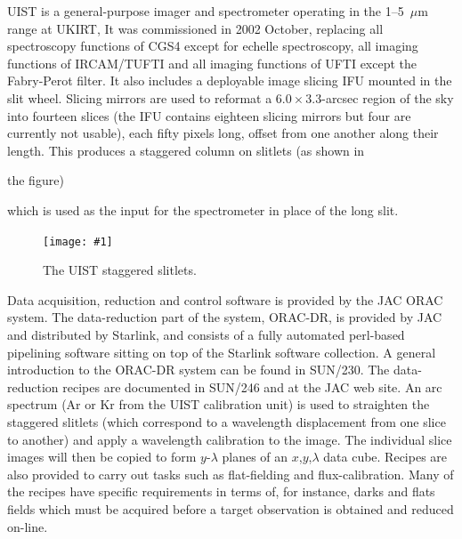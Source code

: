 \documentclass[twoside,11pt]{article}
\newcommand{\htmladdnormallink}[2]{#1}
\newcommand{\htmladdimg}[1]{}
\newcommand{\xref}[3]{#1}
\newcommand{\myfig} [5] {
  \begin{figure}[thb]
    \centering\texttt{[image: \#1]}
    \typeout{#1 inserted on page \arabic{page}}
    \caption{\label{#4}#5}
  \end{figure}
  }
\newcommand{\myfig}[5]{
    \label{#4} \htmladdimg{#3}\\
    Figure: #5\\
    }
\begin{document}
UIST is a general-purpose imager and spectrometer operating in the
1--5~$\mu$m range at
\htmladdnormallink{UKIRT}{http://www.jach.hawaii.edu/UKIRT/}, It was
commissioned in 2002 October, replacing all spectroscopy functions of
CGS4 except for echelle spectroscopy, all imaging functions of
IRCAM/TUFTI and all imaging functions of UFTI except the Fabry-Perot
filter.  It also includes a deployable image slicing IFU mounted in
the slit wheel.  Slicing mirrors are used to reformat a
$6.0\times3.3$-arcsec region of the sky into fourteen slices (the IFU
contains eighteen slicing mirrors but four are currently not usable),
each fifty pixels long, offset from one another along their length.  This
produces a staggered column on slitlets (as shown in
\begin{htmlonly}
the figure)
\end{htmlonly}
 which is used as the input for the
spectrometer in place of the long slit.

\myfig{sc16_uist.eps}{height=0.6\textheight}{sc16_uist.gif}{sc16_uist_fig}{The UIST staggered slitlets.} 

Data acquisition, reduction and control software is provided by the
\htmladdnormallink{JAC}{http://www.jach.hawaii.edu/} ORAC system.  The
data-reduction part of the system,
\htmladdnormallink{ORAC-DR}{http://www.oracdr.org},
is provided by JAC and distributed by Starlink, and consists of a 
fully automated perl-based \htmladdnormallink{pipelining
software}{http://monet.astro.uiuc.edu/adass98/Proceedings/economouf/} sitting on top of the Starlink software
collection.  A general introduction to the ORAC-DR system can be found
in \xref{SUN/230}{sun230}{}.  The data-reduction recipes are 
documented in \xref{SUN/246}{sun246}{} and at the 
\htmladdnormallink{JAC web
site}{http://www.jach.hawaii.edu/UKIRT/instruments/uist/ifu/uistoracdr.html}.
An arc spectrum (Ar or Kr from the UIST calibration unit) is used to
straighten the staggered slitlets (which correspond to a wavelength
displacement from one slice to another) and apply a wavelength
calibration to the image.  The individual slice images will then be
copied to form $y$-$\lambda$ planes of an $x$,$y$,$\lambda$ data cube.
Recipes are also provided to carry out tasks such as flat-fielding and
flux-calibration.  Many of the recipes have specific requirements in
terms of, for instance, darks and flats fields which must be acquired
before a target observation is obtained and reduced on-line.
\end{document}
